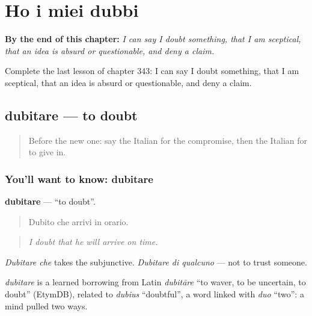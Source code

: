 
\chapter{Ho i miei dubbi}
\label{ch:it-ho-i-miei-dubbi}

\begin{chapteropening}
\textbf{By the end of this chapter:} \emph{I can say I doubt something, that I am sceptical, that an idea is absurd or questionable, and deny a claim.}

Complete the last lesson of chapter 343: I can say I doubt something, that I am sceptical, that an idea is absurd or questionable, and deny a claim.
\end{chapteropening}

\section[dubitare]{dubitare — to doubt}

\label{lesson:IT-C343-dubitare}



\begin{quote}
Before the new one: say the Italian for the compromise, then the Italian for to give in.
\end{quote}

\subsection*{You'll want to know: dubitare}
\textbf{dubitare} — \textquotedblleft{}to doubt\textquotedblright{}.

\begin{quote}
Dubito che arrivi in orario.
\end{quote}

\begin{quote}
\emph{I doubt that he will arrive on time.}
\end{quote}

\emph{Dubitare che} takes the subjunctive. \emph{Dubitare di qualcuno} — not to trust someone.

\begin{cousinweb}
\emph{dubitare} is a learned borrowing from Latin \emph{dubitāre} \textquotedblleft{}to waver, to be uncertain, to doubt\textquotedblright{} (EtymDB), related to \emph{dubius} \textquotedblleft{}doubtful\textquotedblright{}, a word linked with \emph{duo} \textquotedblleft{}two\textquotedblright{}: a mind pulled two ways.
\end{cousinweb}

